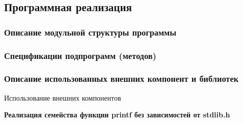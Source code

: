 \hypertarget{ux43fux440ux43eux433ux440ux430ux43cux43cux43dux430ux44f-ux440ux435ux430ux43bux438ux437ux430ux446ux438ux44f}{%
\subsection{Программная
реализация}\label{ux43fux440ux43eux433ux440ux430ux43cux43cux43dux430ux44f-ux440ux435ux430ux43bux438ux437ux430ux446ux438ux44f}}

\hypertarget{ux43eux43fux438ux441ux430ux43dux438ux435-ux43cux43eux434ux443ux43bux44cux43dux43eux439-ux441ux442ux440ux443ux43aux442ux443ux440ux44b-ux43fux440ux43eux433ux440ux430ux43cux43cux44b}{%
\subsubsection{Описание модульной структуры
программы}\label{ux43eux43fux438ux441ux430ux43dux438ux435-ux43cux43eux434ux443ux43bux44cux43dux43eux439-ux441ux442ux440ux443ux43aux442ux443ux440ux44b-ux43fux440ux43eux433ux440ux430ux43cux43cux44b}}

\hypertarget{ux441ux43fux435ux446ux438ux444ux438ux43aux430ux446ux438ux438-ux43fux43eux434ux43fux440ux43eux433ux440ux430ux43cux43c-ux43cux435ux442ux43eux434ux43eux432}{%
\subsubsection{Спецификации подпрограмм
(методов)}\label{ux441ux43fux435ux446ux438ux444ux438ux43aux430ux446ux438ux438-ux43fux43eux434ux43fux440ux43eux433ux440ux430ux43cux43c-ux43cux435ux442ux43eux434ux43eux432}}

\hypertarget{ux43eux43fux438ux441ux430ux43dux438ux435-ux438ux441ux43fux43eux43bux44cux437ux43eux432ux430ux43dux43dux44bux445-ux432ux43dux435ux448ux43dux438ux445-ux43aux43eux43cux43fux43eux43dux435ux43dux442-ux438-ux431ux438ux431ux43bux438ux43eux442ux435ux43a}{%
\subsubsection{Описание использованных внешних компонент и
библиотек}\label{ux43eux43fux438ux441ux430ux43dux438ux435-ux438ux441ux43fux43eux43bux44cux437ux43eux432ux430ux43dux43dux44bux445-ux432ux43dux435ux448ux43dux438ux445-ux43aux43eux43cux43fux43eux43dux435ux43dux442-ux438-ux431ux438ux431ux43bux438ux43eux442ux435ux43a}}

Использование внешних компонентов

\textbf{Реализация семейства функции printf без зависимостей от
stdlib.h}

